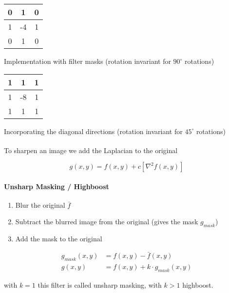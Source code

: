 \begin{tabular}{|c|c|c|} \hline
0 & 1 & 0  \\ \hline
1 &-4 & 1  \\ \hline
0 & 1 & 0  \\ \hline
\end{tabular}
Implementation with filter masks (rotation invariant for $90^\circ$ rotations)

\begin{tabular}{|c|c|c|} \hline
1 & 1 & 1 \\ \hline
1 &-8 & 1 \\ \hline
1 & 1 & 1 \\ \hline
\end{tabular}
Incorporating the diagonal directions (rotation invariant for $45^\circ$ rotations)
\\ \\
To sharpen an image we add the Laplacian to the original

\begin{equation}
g(x,y) = f(x,y) + c \left[ \nabla^2f(x,y) \right]
\end{equation}

\paragraph{Unsharp Masking / Highboost}
\begin{enumerate}
\item Blur the original $\bar{f}$
\item Subtract the blurred image from the original (gives the mask $g_{mask}$)
\item Add the mask to the original
\end{enumerate}
\begin{align}
g_{mask}(x,y) &= f(x,y) - \bar{f}(x,y) \\
g(x,y) &= f(x,y) + k \cdot g_{mask}(x,y)
\end{align}

with $k=1$ this filter is called unsharp masking, with $k>1$ highboost.

